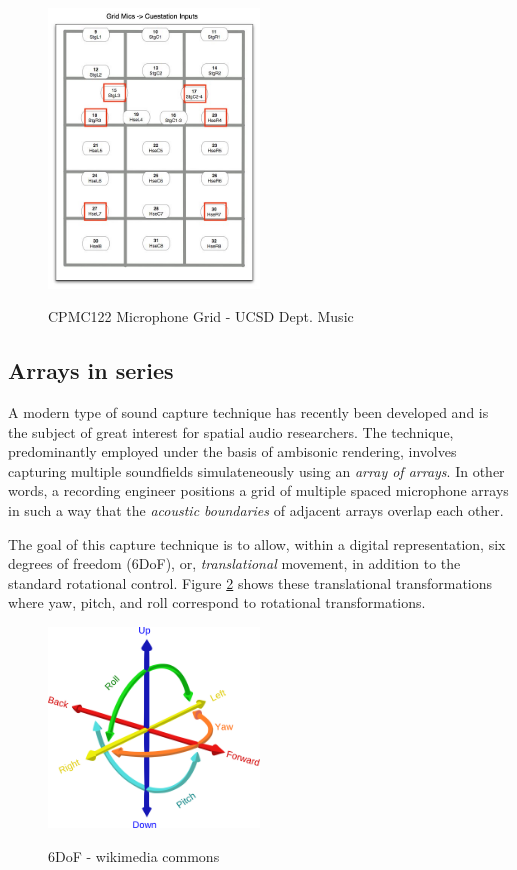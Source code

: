 \begin{figure}[h!]%
\centering
\includegraphics[width=0.5\textwidth]{img/cpmc122-mics.jpg} 
\label{fig:cpmc122-mic-grid}
\caption{CPMC122 Microphone Grid - UCSD Dept. Music}
\end{figure}


\subsection{Arrays in series}
A modern type of sound capture technique has recently been developed and is the subject of great interest for spatial audio researchers. The technique, predominantly employed under the basis of ambisonic rendering, involves capturing multiple soundfields simulateneously using an \textit{array of arrays}. In other words, a recording engineer positions a grid of multiple spaced microphone arrays in such a way that the \textit{acoustic boundaries} of adjacent arrays overlap each other. 

The goal of this capture technique is to allow, within a digital representation, six degrees of freedom (6DoF), or, \textit{translational} movement, in addition to the standard rotational control. Figure \ref{fig:6DoF} shows these translational transformations where yaw, pitch, and roll correspond to rotational transformations. 

\begin{figure}[h!]%
\centering
\includegraphics[width=0.5\textwidth]{img/6DOF.svg.png} 
\label{fig:6DoF}
\caption{6DoF - wikimedia commons}
\end{figure}

